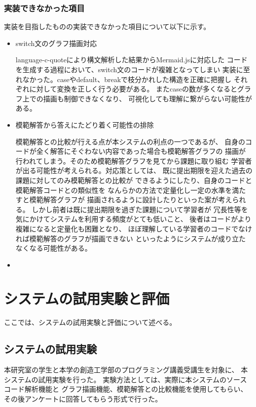 \documentclass{cssspaper}
\begin{document}
        \subsection{実装できなかった項目}
        実装を目指したものの実装できなかった項目について以下に示す。
        \begin{itemize}
            \item switch文のグラフ描画対応
            
            language-c-quoteにより構文解析した結果からMermaid.jsに対応した
            コードを生成する過程において、switch文のコードが複雑となってしまい
            実装に至れなかった。caseやdefault、breakで枝分かれした構造を正確に把握し
            それぞれに対して変換を正しく行う必要がある。
            またcaseの数が多くなるとグラフ上での描画も制御できなくなり、
            可視化しても理解に繋がらない可能性がある。

            \item 模範解答から答えにたどり着く可能性の排除
            
            模範解答との比較が行える点が本システムの利点の一つであるが、
            自身のコードが全く解答にそぐわない内容であった場合も模範解答グラフの
            描画が行われてしまう。そのため模範解答グラフを見てから課題に取り組む
            学習者が出る可能性が考えられる。対応策としては、
            既に提出期限を迎えた過去の課題に対してのみ模範解答との比較が
            できるようにしたり、自身のコードと模範解答コードとの類似性を
            なんらかの方法で定量化し一定の水準を満たすと模範解答グラフが
            描画されるように設計したりといった案が考えられる。
            しかし前者は既に提出期限を過ぎた課題について学習者が
            冗長性等を気にかけてシステムを利用する頻度がとても低いこと、
            後者はコードがより複雑になると定量化も困難となり、
            ほぼ理解している学習者のコードでなければ模範解答のグラフが描画できない
            といったようにシステムが成り立たなくなる可能性がある。

            \item
        
        \end{itemize}

    \chapter{システムの試用実験と評価}
    ここでは、システムの試用実験と評価について述べる。

        \section{システムの試用実験}
        本研究室の学生と本学の創造工学部のプログラミング講義受講生を対象に、
        本システムの試用実験を行った。
        実験方法としては、実際に本システムのソースコード解析機能と
        グラフ描画機能、模範解答との比較機能を使用してもらい、
        その後アンケートに回答してもらう形式で行った。
\end{document}
